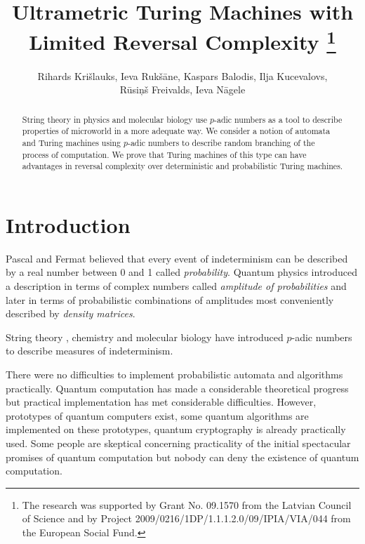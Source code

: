 \documentclass{llncs}
\begin{document}
\title{Ultrametric Turing Machines with Limited Reversal Complexity
\thanks{%
The research was supported by Grant No. 09.1570 from the
Latvian Council of Science and by Project 2009/0216/1DP/1.1.1.2.0/09/IPIA/VIA/044
from the 
European Social Fund.
} 
}

\author{
Rihards Kri\v slauks,
Ieva Ruk\v s\= ane,
Kaspars Balodis,
Ilja Kucevalovs,\\
R\= usi\c n\v s Freivalds,
Ieva N\= agele}

\maketitle

\begin{abstract}  
String theory in physics and molecular biology use $p$-adic numbers as a tool to
describe properties of microworld in a more adequate way. We consider a notion of
automata and Turing machines using $p$-adic numbers to describe random branching of 
the process of computation. 
We prove that Turing machines of this type can have advantages in reversal complexity over
deterministic and probabilistic Turing machines. 
\end{abstract} 



\section{Introduction} 

Pascal and Fermat believed that every event of indeterminism can be described by a real number between 0 and 1 called 
{\em probability}. Quantum physics introduced a description in terms of complex numbers called {\em amplitude of 
probabilities} and later in terms of probabilistic combinations of amplitudes most conveniently described by {\em density
matrices}.

String theory \cite{VVZ95}, chemistry \cite{K06} and molecular biology \cite{DD09,Kh97} have introduced $p$-adic numbers to describe
measures of indeterminism. 

There were no difficulties to implement probabilistic automata and algorithms practically. Quantum computation \cite{H01}  has made a considerable
theoretical progress but practical implementation has met considerable difficulties. However, prototypes of quantum computers exist, some
quantum algorithms are implemented on these prototypes, quantum cryptography is already practically used. Some people are skeptical concerning
practicality of the initial spectacular promises of quantum computation but nobody can deny the existence of quantum computation.
\end{document}

